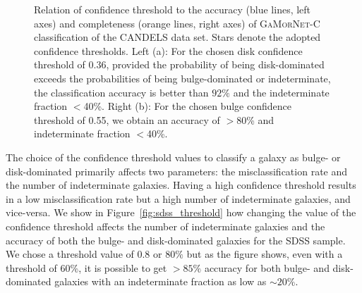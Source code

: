 \documentclass[twocolumn]{aastex63}
\newcommand\gamornet{G\textsc{a}M\textsc{or}N\textsc{et}}
\begin{document}
\begin{figure}[htb]
	\begin{center}
  \end{center}
  \caption{Relation of confidence threshold to the accuracy (blue lines, left axes) and completeness (orange lines, right axes) of \gamornet{}-C classification of the CANDELS data set. Stars denote the adopted confidence thresholds.
  Left (a): For the chosen disk confidence threshold of 0.36, provided the probability of being disk-dominated exceeds the probabilities of being bulge-dominated or indeterminate, the classification accuracy is better than $92\%$ and the indeterminate fraction $<$40\%.
  Right (b): For the chosen bulge confidence threshold of 0.55, we obtain an accuracy of $>$80\% and indeterminate fraction $<$40\%. }
  \label{fig:candels_threshold}
\end{figure}

The choice of the confidence threshold values to classify a galaxy as bulge- or disk-dominated primarily affects two parameters: the misclassification rate and the number of indeterminate galaxies. Having a high confidence threshold results in a low misclassification rate but a high number of indeterminate galaxies, and vice-versa. We show in Figure~\ref{fig:sdss_threshold} how changing the value of the confidence threshold affects the number of indeterminate galaxies and the accuracy of both the bulge- and disk-dominated galaxies for the SDSS sample. We chose a threshold value of 0.8 or $80\%$ but as the figure shows, even with a threshold of 60\%, it is possible to get $> 85\%$ accuracy for both bulge- and disk-dominated galaxies with an indeterminate fraction as low as $\sim 20\%$.
\end{document}
